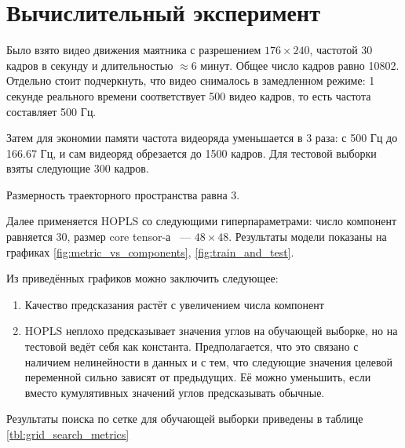 \documentclass[a4paper,14pt]{article}
\theoremstyle{plain} %
\theoremstyle{definition} %
\theoremstyle{remark} %
\begin{document}
	\section{Вычислительный эксперимент}
	Было взято видео движения маятника с разрешением $176 \times 240$, частотой 30 кадров в секунду и длительностью $\approx$6 минут.
	Общее число кадров равно 10802.  
	Отдельно стоит подчеркнуть, что видео снималось в замедленном режиме: 1 секунде реального времени соответствует 500 видео кадров, то есть частота составляет 500 Гц.  
	
	Затем для экономии памяти частота видеоряда уменьшается в 3 раза: с 500 Гц до 166.67 Гц, и сам видеоряд обрезается до 1500 кадров.  
	Для тестовой выборки взяты следующие 300 кадров.
	
	Размерность траекторного пространства равна 3.
	
	Далее применяется HOPLS со следующими гиперпараметрами: число компонент равняется $30$, размер core tensor-а ~--- $48 \times 48$. 
	Результаты модели показаны на графиках \ref{fig:metric_vs_components}, \ref{fig:train_and_test}.
	
	Из приведённых графиков можно заключить следующее:
	\begin{enumerate}
		\item Качество предсказания растёт с увеличением числа компонент
		\item HOPLS неплохо предсказывает значения углов на обучающей выборке, но на тестовой ведёт себя как константа. Предполагается, что это связано с наличием нелинейности в данных и с тем, что следующие значения целевой переменной сильно зависят от предыдущих. Её можно уменьшить, если вместо кумулятивных значений углов предсказывать обычные.
	\end{enumerate}

	Результаты поиска по сетке для обучающей выборки приведены в таблице \ref{tbl:grid_search_metrics}
	
\end{document}
